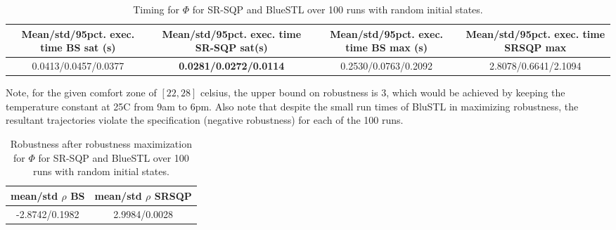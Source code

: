 \begin{table*}[tb]
\small
\begin{center}
\caption{{\small Timing for $\Phi$ for SR-SQP and BlueSTL over 100 runs with random initial states.}}
\vspace{-10pt}
\label{tbl:bldg}
\begin{tabular} {|c|c|c|c|}
	\hline
	 Mean/std/95pct. exec. time BS sat (s)  &  Mean/std/95pct. exec. time SR-SQP sat(s) & Mean/std/95pct. exec. time BS max (s) & Mean/std/95pct. exec. time SRSQP max 	 \\ \hline
0.0413/0.0457/0.0377 & \textbf{0.0281/0.0272/0.0114} & 0.2530/0.0763/0.2092 & 2.8078/0.6641/2.1094\\ \hline	
\end{tabular}	
\end{center}
\vspace{-20pt}
\end{table*}

Note, for the given comfort zone of $[22,28]$ celsius, the upper bound on robustness is $3$, which would be achieved by keeping the temperature constant at 25C from 9am to 6pm. Also note that despite the small run times of BluSTL in maximizing robustness, the resultant trajectories violate the specification (negative robustness) for each of the 100 runs. 

\begin{table}[tb]
\small
\begin{center}
\caption{{\small Robustness after robustness maximization for $\Phi$ for SR-SQP and BlueSTL over 100 runs with random initial states.}}
\vspace{-10pt}
\label{tbl:bldg_robustness}
\begin{tabular} {|c|c|}
	\hline
	 mean/std $\rho$ BS & mean/std $\rho$ SRSQP \\ \hline
 -2.8742/0.1982 & 2.9984/0.0028\\ \hline	
\end{tabular}	
\end{center}
\vspace{-20pt}
\end{table}
